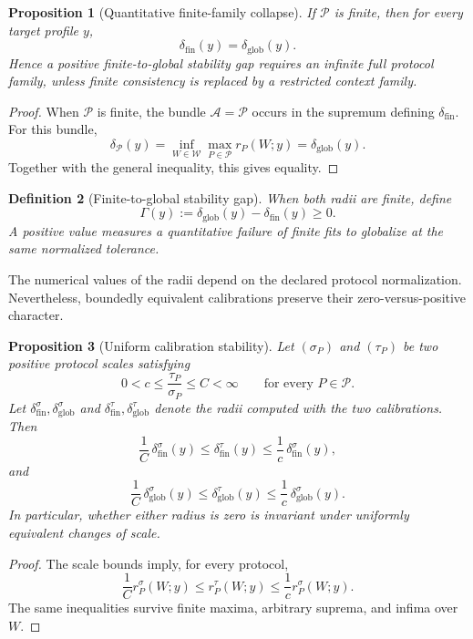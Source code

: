 \documentclass[11pt]{article}
\newtheorem{definition}{Definition}[section]
\newtheorem{proposition}[definition]{Proposition}
\newcommand{\W}{\mathcal W}
\newcommand{\Pcal}{\mathcal P}
\newcommand{\Acal}{\mathcal A}
\begin{document}
\begin{proposition}[Quantitative finite-family collapse]
If $\Pcal$ is finite, then for every target profile $y$,
\[
\delta_{\mathrm{fin}}(y)
=
\delta_{\mathrm{glob}}(y).
\]
Hence a positive finite-to-global stability gap requires an infinite full
protocol family, unless finite consistency is replaced by a restricted context
family.
\end{proposition}

\begin{proof}
When $\Pcal$ is finite, the bundle $\Acal=\Pcal$ occurs in the supremum defining
$\delta_{\mathrm{fin}}$. For this bundle,
\[
\delta_{\Pcal}(y)
=
\inf_{W\in\W}
\max_{P\in\Pcal}r_P(W;y)
=
\delta_{\mathrm{glob}}(y).
\]
Together with the general inequality, this gives equality.
\end{proof}

\begin{definition}[Finite-to-global stability gap]
When both radii are finite, define
\[
\Gamma(y)
:=
\delta_{\mathrm{glob}}(y)
-
\delta_{\mathrm{fin}}(y)
\ge0.
\]
A positive value measures a quantitative failure of finite fits to globalize
at the same normalized tolerance.
\end{definition}

The numerical values of the radii depend on the declared protocol
normalization. Nevertheless, boundedly equivalent calibrations preserve their
zero-versus-positive character.

\begin{proposition}[Uniform calibration stability]
Let $(\sigma_P)$ and $(\tau_P)$ be two positive protocol scales satisfying
\[
0<c\le
\frac{\tau_P}{\sigma_P}
\le C<\infty
\qquad
\text{for every }P\in\Pcal.
\]
Let $\delta^{\sigma}_{\mathrm{fin}},
\delta^{\sigma}_{\mathrm{glob}}$ and
$\delta^{\tau}_{\mathrm{fin}},
\delta^{\tau}_{\mathrm{glob}}$
denote the radii computed with the two calibrations. Then
\[
\frac1C\,
\delta^{\sigma}_{\mathrm{fin}}(y)
\le
\delta^{\tau}_{\mathrm{fin}}(y)
\le
\frac1c\,
\delta^{\sigma}_{\mathrm{fin}}(y),
\]
and
\[
\frac1C\,
\delta^{\sigma}_{\mathrm{glob}}(y)
\le
\delta^{\tau}_{\mathrm{glob}}(y)
\le
\frac1c\,
\delta^{\sigma}_{\mathrm{glob}}(y).
\]
In particular, whether either radius is zero is invariant under uniformly
equivalent changes of scale.
\end{proposition}

\begin{proof}
The scale bounds imply, for every protocol,
\[
\frac1C r_P^\sigma(W;y)
\le
r_P^\tau(W;y)
\le
\frac1c r_P^\sigma(W;y).
\]
The same inequalities survive finite maxima, arbitrary suprema, and infima over
$W$.
\end{proof}
\end{document}
